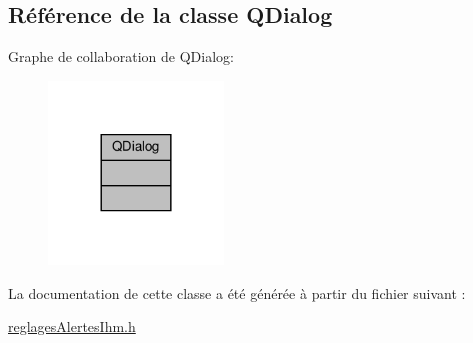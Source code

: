 \hypertarget{class_q_dialog}{}\subsection{Référence de la classe Q\+Dialog}
\label{class_q_dialog}


Graphe de collaboration de Q\+Dialog\+:\nopagebreak
\begin{figure}[H]
\begin{center}
\leavevmode
\includegraphics[width=132pt]{class_q_dialog__coll__graph}
\end{center}
\end{figure}


La documentation de cette classe a été générée à partir du fichier suivant \+:\begin{DoxyCompactItemize}
\item 
\hyperlink{reglages_alertes_ihm_8h}{reglages\+Alertes\+Ihm.\+h}\end{DoxyCompactItemize}
